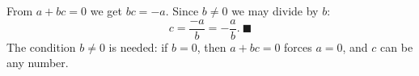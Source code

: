 From $a+bc=0$ we get $bc=-a$. Since $b\ne0$ we may divide by $b$:
\[c=\dfrac{-a}{b}=-\dfrac ab.\ \blacksquare\]
The condition $b\ne0$ is needed: if $b=0$, then $a+bc=0$ forces $a=0$, and $c$ can be any number.
